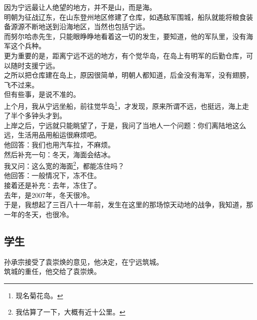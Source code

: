 \begin{multicols}{\theparacolNo}
因为宁远最让人绝望的地方，并不是山，而是海。\\

明朝为征战辽东，在山东登州地区修建了仓库，如遇敌军围城，船队就能将粮食装备源源不断地送到沿海地区，当然也包括宁远。\\

而努尔哈赤先生，只能眼睁睁地看着这一切的发生，要知道，他的军队里，没有海军这个兵种。\\

更为重要的是，距离宁远不远的地方，有个觉华岛，在岛上有明军的后勤仓库，可以随时支援宁远。\\

之所以把仓库建在岛上，原因很简单，明朝人都知道，后金没有海军，没有翅膀，飞不过来。\\

但有些事，是说不准的。\\

上个月，我从宁远坐船，前往觉华岛\footnote{现名菊花岛。}，才发现，原来所谓不远，也挺远，海上走了半个多钟头才到。\\

上岸之后，宁远就只能眺望了，于是，我问了当地人一个问题：你们离陆地这么远，生活用品用船运很麻烦吧。\\

他回答：我们也用汽车拉，不麻烦。\\

然后补充一句：冬天，海面会结冰。\\

我又问：这么宽的海面\footnote{我估算了一下，大概有近十公里。}，都能冻住吗？\\

他回答：一般情况下，冻不住。\\

接着还是补充：去年，冻住了。\\

去年，是2007年，冬天很冷。\\

于是，我想起了三百八十一年前，发生在这里的那场惊天动地的战争，我知道，那一年的冬天，也很冷。\\

\subsection{学生}
孙承宗接受了袁崇焕的意见，他决定，在宁远筑城。\\

筑城的重任，他交给了袁崇焕。\\


\end{multicols}
